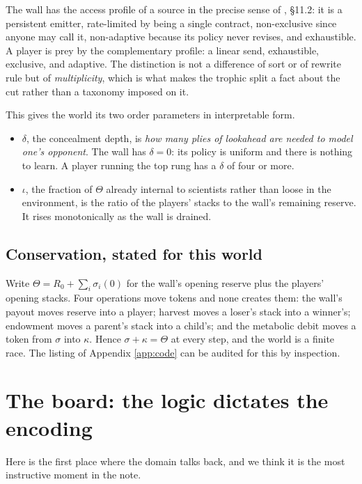 \documentclass[11pt]{article}
\theoremstyle{definition}
\theoremstyle{plain}
\theoremstyle{remark}
\begin{document}
The wall has the access profile of a source in the precise sense of
\cite{scientist}, \S11.2: it is a persistent emitter, rate-limited by being a
single contract, non-exclusive since anyone may call it, non-adaptive because
its policy never revises, and exhaustible. A player is prey by the complementary
profile: a linear send, exhaustible, exclusive, and adaptive. The distinction is
not a difference of sort or of rewrite rule but of \emph{multiplicity}, which is
what makes the trophic split a fact about the cut rather than a taxonomy imposed
on it.

This gives the world its two order parameters in interpretable form.
\begin{itemize}
\item $\delta$, the concealment depth, is \emph{how many plies of lookahead are
needed to model one's opponent}. The wall has $\delta = 0$: its policy is
uniform and there is nothing to learn. A player running the top rung has a
$\delta$ of four or more.
\item $\iota$, the fraction of $\Theta$ already internal to scientists rather
than loose in the environment, is the ratio of the players' stacks to the wall's
remaining reserve. It rises monotonically as the wall is drained.
\end{itemize}

\subsection{Conservation, stated for this world}

Write $\Theta = R_0 + \sum_i \sigma_i(0)$ for the wall's opening reserve plus
the players' opening stacks. Four operations move tokens and none creates them:
the wall's payout moves reserve into a player; harvest moves a loser's stack
into a winner's; endowment moves a parent's stack into a child's; and the
metabolic debit moves a token from $\sigma$ into $\kappa$. Hence $\sigma+\kappa
= \Theta$ at every step, and the world is a finite race. The listing of Appendix
\ref{app:code} can be audited for this by inspection.

\section{The board: the logic dictates the encoding}\label{sec:board}

Here is the first place where the domain talks back, and we think it is the most
instructive moment in the note.
\end{document}
